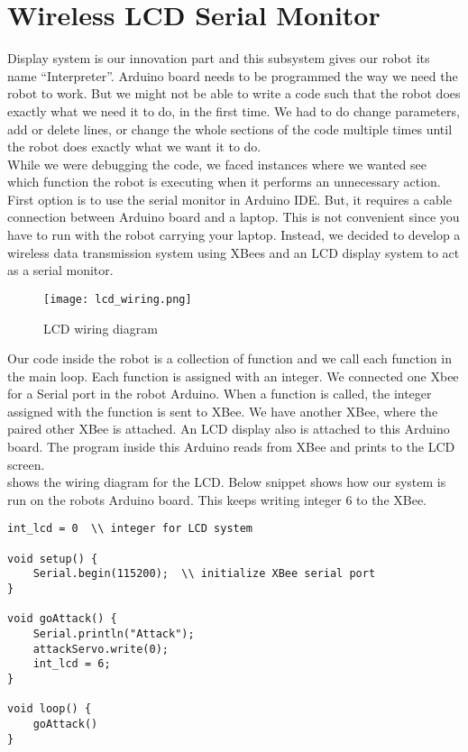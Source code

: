\documentclass[11pt, letterpaper, oneside]{article}
\begin{document}
\newpage
\section{Wireless LCD Serial Monitor}
Display system is our innovation part and this subsystem gives our robot its name ``Interpreter''. Arduino board needs to be programmed the way we need the robot to work. But we might not be able to write a code such that the robot does exactly what we need it to do, in the first time. We had to do change parameters, add or delete lines, or change the whole sections of the code multiple times until the robot does exactly what we want it to do. \\

While we were debugging the code, we faced instances where we wanted see which function the robot is executing when it performs an unnecessary action. First option is to use the serial monitor in Arduino IDE. But, it requires a cable connection between Arduino board and a laptop. This is not convenient since you have to run with the robot carrying your laptop. Instead, we decided to develop a wireless data transmission system using XBees and an LCD display system to act as a serial monitor.\\

\begin{figure}[bth]
	\begin{center}
		\texttt{[image: lcd\_wiring.png]}
		\caption{LCD wiring diagram}
		\label{fig:lcd_wiring}
	\end{center}
\end{figure}

Our code inside the robot is a collection of function and we call each function in the main loop. Each function is assigned with an integer. We connected one Xbee for a Serial port in the robot Arduino. When a function is called, the integer assigned with the function is sent to XBee. We have another XBee, where the paired other XBee is attached. An LCD display also is attached to this Arduino board. The program inside this Arduino reads from XBee and prints to the LCD screen.\\


 shows the wiring diagram for the LCD. Below snippet shows how our system is run on the robots Arduino board. This keeps writing integer 6 to the XBee.
\newpage
\begin{verbatim}
int_lcd = 0  \\ integer for LCD system

void setup() {
    Serial.begin(115200);  \\ initialize XBee serial port
}

void goAttack() {
    Serial.println("Attack");
    attackServo.write(0);
    int_lcd = 6;
}

void loop() {
    goAttack()
}
\end{verbatim}
\end{document}
